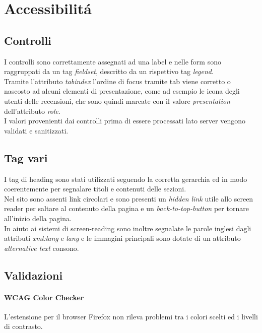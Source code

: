 \section{Accessibilitá}

\subsection{Controlli}
I controlli sono correttamente assegnati ad una label e nelle form sono raggruppati da un tag \textit{fieldset}, descritto da un rispettivo tag \textit{legend}.\\
Tramite l'attributo \textit{tabindex} l'ordine di focus tramite tab viene corretto o nascosto ad alcuni elementi di presentazione, come ad esempio le icona degli utenti delle recensioni, che sono quindi marcate con il valore \textit{presentation} dell'attributo \textit{role}.\\
I valori provenienti dai controlli prima di essere processati lato server vengono validati e sanitizzati.

\subsection{Tag vari}
I tag di heading sono stati utilizzati seguendo la corretta gerarchia ed in modo coerentemente per segnalare titoli e contenuti delle sezioni.\\
Nel sito sono assenti link circolari e sono presenti un \textit{hidden link} utile allo screen reader per saltare al contenuto della pagina e un \textit{back-to-top-button} per tornare all'inizio della pagina.\\
In aiuto ai sistemi di screen-reading sono inoltre segnalate le parole inglesi dagli attributi \textit{xml:lang} e \textit{lang} e le immagini principali sono dotate di un attributo \textit{alternative text} consono.

\subsection{Validazioni}


\paragraph{WCAG Color Checker}
L'estensione per il browser Firefox non rileva problemi tra i colori scelti ed i livelli di contrasto.

